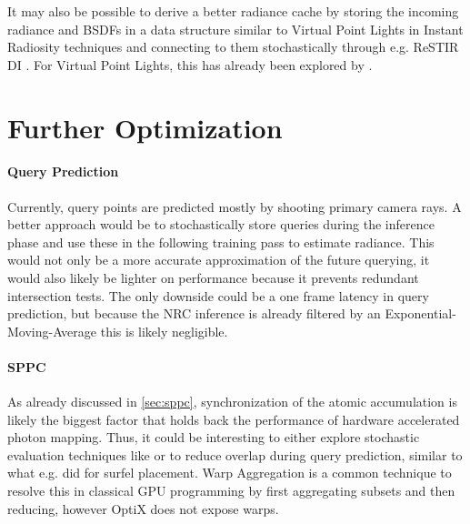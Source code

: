 It may also be possible to derive a better radiance cache by storing the incoming radiance and BSDFs in a data structure similar to Virtual Point Lights in Instant Radiosity techniques \parencite{keller1997} and connecting to them stochastically through e.g. ReSTIR DI \parencite{bitterli2020}.
For Virtual Point Lights, this has already been explored by \textcite{bruin2025}.

\section{Further Optimization}

\paragraph{Query Prediction}
Currently, query points are predicted mostly by shooting primary camera rays.
A better approach would be to stochastically store queries during the inference phase and use these in the following training pass to estimate radiance.
This would not only be a more accurate approximation of the future querying, it would also likely be lighter on performance because it prevents redundant intersection tests.
The only downside could be a one frame latency in query prediction, but because the NRC inference is already filtered by an Exponential-Moving-Average this is likely negligible.

\paragraph{SPPC} As already discussed in \cref{sec:sppc}, synchronization of the atomic accumulation is likely the biggest factor that holds back the performance of hardware accelerated photon mapping.
Thus, it could be interesting to either explore stochastic evaluation techniques like \textcite{kern2023} or to reduce overlap during query prediction, similar to what e.g. \textcite{stachowiak2018} did for surfel placement.
Warp Aggregation is a common technique to resolve this in classical GPU programming by first aggregating subsets and then reducing, however OptiX does not expose warps.